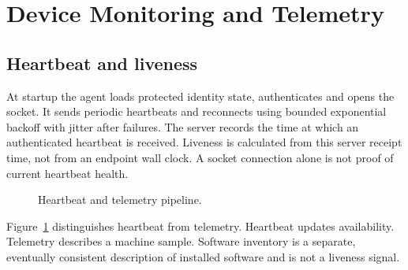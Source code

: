 \documentclass[12pt,a4paper]{report}
\begin{document}
\section{Device Monitoring and Telemetry}

\subsection{Heartbeat and liveness}
At startup the agent loads protected identity state, authenticates and opens the
socket. It sends periodic heartbeats and reconnects using bounded exponential
backoff with jitter after failures. The server records the time at which an
authenticated heartbeat is received. Liveness is calculated from this server
receipt time, not from an endpoint wall clock. A socket connection alone is not
proof of current heartbeat health.

\begin{figure}[H]
\centering
{}
\caption{Heartbeat and telemetry pipeline.}
\label{fig:heartbeat-pipeline}
\end{figure}

Figure~\ref{fig:heartbeat-pipeline} distinguishes heartbeat from telemetry.
Heartbeat updates availability. Telemetry describes a machine sample. Software
inventory is a separate, eventually consistent description of installed
software and is not a liveness signal.
\end{document}

